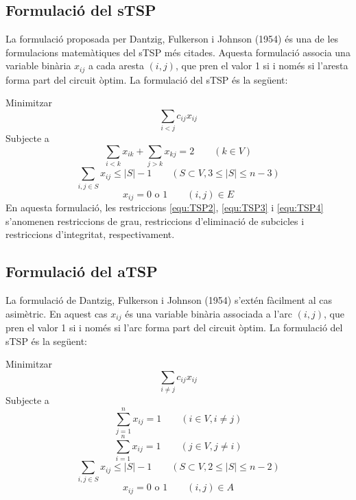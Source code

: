 \documentclass[a4paper,12pt,twoside]{ThesisStyle}
\begin{document}
\subsection{Formulació del sTSP}
\label{FormulacioSTSP}
La formulació proposada per Dantzig, Fulkerson i Johnson (1954) és una de les formulacions matemàtiques del sTSP més citades. Aquesta formulació associa una variable binària \(x_{ij}\) a cada aresta \( (i,j) \), que pren el valor 1 si i només si l'aresta forma part del circuit òptim. La formulació del sTSP és la següent:

Minimitzar
\begin{equation}
  \sum_{i<j} c_{ij} x_{ij}
  \label{equ:TSP1}
\end{equation}
Subjecte a
\begin{equation}
  \sum_{i < k} x_{ik} + \sum_{j > k} x_{kj}= 2 \quad\quad \left( k \in V \right)
  \label{equ:TSP2}
\end{equation}
\begin{equation}
  \sum_{i, j \in S} x_{ij} \leq |S| - 1 \quad\quad \left( S \subset V, 3 \leq |S| \leq n-3 \right)
  \label{equ:TSP3}
\end{equation}
\begin{equation}
  x_{ij} = 0 \text{ o } 1 \quad\quad (i,j) \in E
  \label{equ:TSP4}
\end{equation}
En aquesta formulació, les restriccions \eqref{equ:TSP2}, \eqref{equ:TSP3} i \eqref{equ:TSP4} s'anomenen restriccions de grau, restriccions d'eliminació de subcicles i restriccions d'integritat, respectivament.

\subsection{Formulació del aTSP}
\label{FormulacioATSP}
La formulació de Dantzig, Fulkerson i Johnson (1954) s'extén fàcilment al cas asimètric. En aquest cas \(x_{ij}\) és una variable binària associada a l'arc \( (i,j) \), que pren el valor 1 si i només si l'arc forma part del circuit òptim. La formulació del sTSP és la següent:

Minimitzar
\begin{equation}
  \sum_{i \neq j} c_{ij} x_{ij}
  \label{equ:TSP5}
\end{equation}
Subjecte a
\begin{equation}
  \sum_{j=1}^{n} x_{ij} = 1 \quad\quad \left( i \in V, i \neq j \right)
  \label{equ:TSP6}
\end{equation}
\begin{equation}
  \sum_{i=1}^{n} x_{ij} = 1 \quad\quad \left( j \in V, j \neq i \right)
  \label{equ:TSP7}
\end{equation}
\begin{equation}
  \sum_{i, j \in S} x_{ij} \leq |S| - 1 \quad\quad \left( S \subset V, 2 \leq |S| \leq n-2 \right)
  \label{equ:TSP8}
\end{equation}
\begin{equation}
  x_{ij} = 0 \text{ o } 1 \quad\quad (i,j) \in A
  \label{equ:TSP9}
\end{equation}
\end{document}
